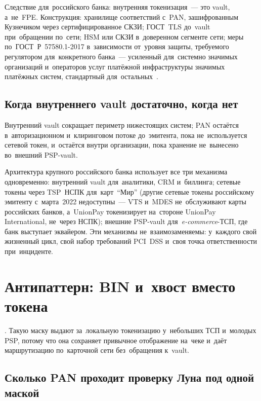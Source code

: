 Следствие для~российского банка: внутренняя токенизация~--- это vault,
а~не~FPE. Конструкция: хранилище соответствий с~PAN, зашифрованным Кузнечиком
через сертифицированное СКЗИ; ГОСТ~TLS до~vault при~обращении по~сети; HSM или
СКЗИ в~доверенном сегменте сети; меры по~ГОСТ~Р~57580.1-2017
в~зависимости от~уровня защиты, требуемого
регулятором для~конкретного банка~--- усиленный для~системно значимых
организаций и~операторов услуг платёжной инфраструктуры значимых платёжных
систем, стандартный
для~остальных~\cite{gost-57580-1}.

\subsection*{Когда внутреннего vault достаточно, когда нет}

Внутренний vault сокращает периметр нижестоящих систем; PAN остаётся
в~авторизационном и~клиринговом потоке до~эмитента, пока не~используется
сетевой токен, и~остаётся внутри организации, пока хранение не~вынесено
во~внешний PSP-vault.

Архитектура крупного российского банка использует все три механизма
одновременно: внутренний vault для~аналитики, CRM и~биллинга; сетевые токены
через TSP~НСПК для~карт~\enquote{Мир} (другие сетевые токены российскому
  эмитенту с~марта~2022 недоступны~--- VTS и~MDES не~обслуживают карты
  российских банков, а~UnionPay токенизирует на~стороне UnionPay International,
не~через НСПК); внешние PSP-vault для~\textit{e-commerce}-ТСП, где банк
выступает эквайером. Эти механизмы не~взаимозаменяемы: у~каждого свой
жизненный цикл, свой набор требований PCI~DSS и~своя точка ответственности
при~инциденте.

\section{Антипаттерн: BIN и~хвост вместо токена}\label{sec:token-bin-last4-antipattern}

. Такую маску выдают
за~локальную токенизацию у~небольших ТСП и~молодых PSP, потому что она
сохраняет привычное отображение на~чеке и~даёт маршрутизацию
по~карточной сети без~обращения к~vault.

\subsection*{Сколько PAN проходит проверку Луна под одной маской}

